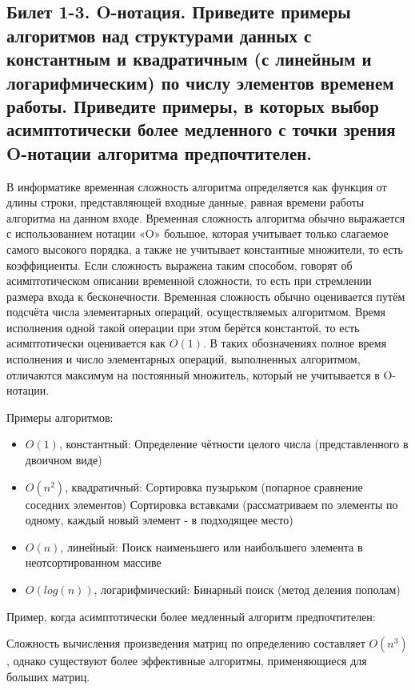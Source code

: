 \documentclass[a4paper, 12pt]{article}
\begin{document}
	\subsection*{Билет 1-3. O-нотация. Приведите примеры алгоритмов над структурами данных с константным и квадратичным (с линейным и логарифмическим) по числу элементов временем работы. Приведите примеры, в которых выбор асимптотически более медленного с точки зрения O-нотации алгоритма предпочтителен.}
	В информатике временная сложность алгоритма определяется как функция от длины строки, представляющей входные данные, равная времени работы алгоритма на данном входе. Временная сложность алгоритма обычно выражается с использованием нотации «O» большое, которая учитывает только слагаемое самого высокого порядка, а также не учитывает константные множители, то есть коэффициенты. Если сложность выражена таким способом, говорят об асимптотическом описании временной сложности, то есть при стремлении размера входа к бесконечности. Временная сложность обычно оценивается путём подсчёта числа элементарных операций, осуществляемых алгоритмом. Время исполнения одной такой операции при этом берётся константой, то есть асимптотически оценивается как $O(1)$. В таких обозначениях полное время исполнения и число элементарных операций, выполненных алгоритмом, отличаются максимум на постоянный множитель, который не учитывается в O-нотации.
	
	Примеры алгоритмов:
	\begin{itemize}
		\item $O(1)$, константный:
		\subitem Определение чётности целого числа (представленного в двоичном виде)
		\item $O(n^{2})$, квадратичный:
		\subitem Сортировка пузырьком (попарное сравнение соседних элементов)
		\subitem Сортировка вставками (рассматриваем по элементы по одному, каждый новый элемент - в подходящее место)
		\item $O(n)$, линейный:
		\subitem Поиск наименьшего или наибольшего элемента в неотсортированном массиве
		\item $O(log(n))$, логарифмический:
		\subitem Бинарный поиск (метод деления пополам)
	\end{itemize}
	
	Пример, когда асимптотически более медленный алгоритм предпочтителен:
	
	Сложность вычисления произведения матриц по определению составляет $O(n^{3})$, однако существуют более эффективные алгоритмы, применяющиеся для больших матриц.
	
\end{document}
